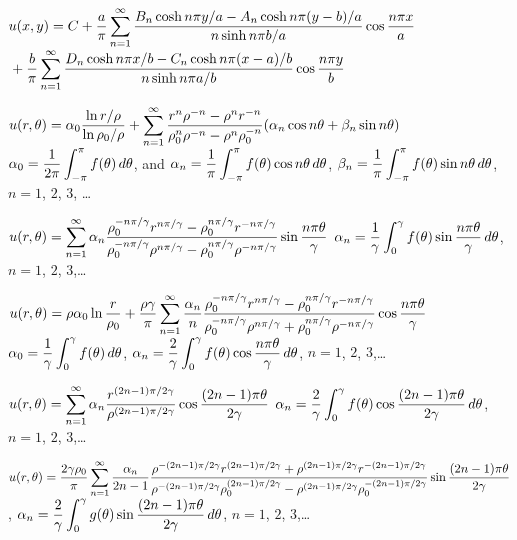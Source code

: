 $\displaystyle u(x,y)=C+
\frac{a}{\pi}\sum_{n=1}^\infty\frac{B_n\cosh n\pi y/a-A_n\cosh
n\pi(y-b)/a}{ n\sinh n\pi b/a}\cos\frac{n\pi x}{a}$\\
\hspace*{6.5em}$\displaystyle{}+\frac{b}{\pi}\sum_{n=1}^\infty\frac{D_n\cosh n\pi
x/b-C_n\cosh n\pi(x-a)/b}{ n\sinh n\pi a/b}\cos\frac{n\pi y}{b}$



$u(r,\theta)=\displaystyle\alpha_0\frac{\ln r/\rho}{\ln\rho_0/\rho}+
\sum_{n=1}^\infty
\frac{r^n\rho^{-n}-\rho^nr^{-n}}
{\rho_0^n\rho^{-n}-\rho^n\rho_0^{-n}}
(\alpha_n\cos
n\theta+\beta_n\sin n\theta)$
$\displaystyle\alpha_0=\frac{1}{2\pi}\int_{-\pi}^\pi f(\theta)\,d\theta$,
and
$\displaystyle\alpha_n=\frac{1}{\pi}\int_{-\pi}^\pi f(\theta)\cos
n\theta\,d\theta$,\quad
$\displaystyle\beta_n=\frac{1}{\pi}\int_{-\pi}^\pi f(\theta)\sin
n\theta\,d\theta$,\;
 $n=1$, $2$, $3$, \dots

$\displaystyle u(r,\theta)=\sum_{n=1}^\infty\alpha_n
\displaystyle\frac{\rho_0^{-n\pi/\gamma}r^{n\pi/\gamma}-\rho_0^{n\pi/\gamma}
r^{-n\pi/\gamma}}{\rho_0^{-n\pi/\gamma}\rho^{n\pi/\gamma}-\rho_0^{n\pi/\gamma}
\rho^{-n\pi/\gamma}}
\sin\frac{n\pi\theta}{\gamma}$   \quad
$\alpha_n=\displaystyle\frac{1}{\gamma}\int_0^\gamma
f(\theta)\sin\frac{n\pi\theta}{\gamma}\,d\theta$, $n=1$, $2$,
$3$,\dots

$\displaystyle u(r,\theta)=
\rho\alpha_0\displaystyle\ln\frac{r}{\rho_0}+\frac{\rho\gamma}{\pi}\sum_{n=1}^\infty\frac{\alpha_n}{n}
\displaystyle\frac{\rho_0^{-n\pi/\gamma}r^{n\pi/\gamma}-\rho_0^{n\pi/\gamma}
r^{-n\pi/\gamma}}
{\rho_0^{-n\pi/\gamma}\rho^{n\pi/\gamma}+\rho_0^{n\pi/\gamma}
\rho^{-n\pi/\gamma}}
\displaystyle\cos\frac
{n\pi\theta}{\gamma}$
$\alpha_0=\displaystyle\frac{1}{\gamma}\int_0^\gamma
f(\theta)\,d\theta$,\quad
$\alpha_n=\displaystyle\frac{2}{\gamma}\int_0^\gamma
f(\theta)\cos\frac{n\pi\theta}{\gamma}\,d\theta$, $n=1$, $2$,
$3$,\dots

$u(r,\theta)=\displaystyle\sum_{n=1}^\infty\alpha_n
\displaystyle\frac{r^{(2n-1)\pi/2\gamma}}{\rho^{(2n-1)\pi/2\gamma}}
\cos\frac
{(2n-1)\pi\theta}{2\gamma}$
$\alpha_n=\displaystyle\frac{2}{\gamma}\int_0^\gamma
f(\theta)\cos\frac{(2n-1)\pi\theta}{2\gamma}\,d\theta$,\;
  $n=1$, $2$, $3$,\dots


$u(r,\theta)=\displaystyle\frac{2\gamma\rho_0}{\pi}\sum_{n=1}^\infty
\frac{\alpha_n}{2n-1}
\frac{\rho^{-(2n-1)\pi/2\gamma}r^{(2n-1)\pi/2\gamma}+
\rho^{(2n-1)\pi/2\gamma}r^{-(2n-1)\pi/2\gamma}}
{\rho^{-(2n-1)\pi/2\gamma}\rho_0^{(2n-1)\pi/2\gamma}-
\rho^{(2n-1)\pi/2\gamma}\rho_0^{-(2n-1)\pi/2\gamma}}
\displaystyle\sin\frac
{(2n-1)\pi\theta}{2\gamma}$,
$\alpha_n=\displaystyle\frac{2}{\gamma}\int_0^\gamma
g(\theta)\sin\frac{(2n-1)\pi\theta}{2\gamma}\,d\theta$,
 $n=1$, $2$, $3$,\dots

